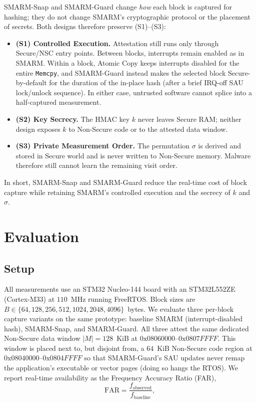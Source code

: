 \documentclass[conference]{IEEEtran}
\newcommand{\FAR}{FAR\xspace}
\newcommand{\smarmcopy}{SMARM-Snap\xspace}
\newcommand{\smarmlock}{SMARM-Guard\xspace}
\begin{document}
\smarmcopy and \smarmlock{} change \emph{how} each block is captured
for hashing; they do not change SMARM's cryptographic protocol or the
placement of secrets. Both designs therefore preserve (S1)--(S3):
\begin{itemize}
  \item \textbf{(S1) Controlled Execution.}
    Attestation still runs only through Secure/NSC entry points.
    Between blocks, interrupts remain enabled as in SMARM.
    Within a block, Atomic Copy keeps interrupts disabled for the
    entire \texttt{Memcpy}, and \smarmlock{} instead makes the
    selected block Secure-by-default for the duration of the in-place
    hash (after a brief IRQ-off SAU lock/unlock sequence).
    In either case, untrusted software cannot splice into a
    half-captured measurement.
  \item \textbf{(S2) Key Secrecy.}
    The HMAC key $k$ never leaves Secure RAM; neither design exposes
    $k$ to Non-Secure code or to the attested data window.
  \item \textbf{(S3) Private Measurement Order.}
    The permutation $\sigma$ is derived and stored in Secure world and
    is never written to Non-Secure memory. Malware therefore still
    cannot learn the remaining visit order.
\end{itemize}
In short, \smarmcopy and \smarmlock{} reduce the real-time cost of
block capture while retaining SMARM's controlled execution and the
secrecy of $k$ and $\sigma$.

\section{Evaluation}
\label{sec:eval}

\subsection{Setup}

All measurements use an STM32 Nucleo-144 board with an
STM32L552ZE (Cortex-M33) at $110$~MHz running FreeRTOS.
Block sizes are $B\in\{64,128,256,512,1024,2048,4096\}$~bytes.
We evaluate three per-block capture variants on the same prototype:
baseline SMARM (interrupt-disabled hash), \smarmcopy{}, and
\smarmlock{}.
All three attest the same dedicated Non-Secure data window
$|M|{=}128$~KiB at $0\mathrm{x}08060000$--$0\mathrm{x}0807FFFF$.
This window is placed next to, but disjoint from, a $64$~KiB
Non-Secure code region at $0\mathrm{x}08040000$--$0\mathrm{x}0804FFFF$
so that \smarmlock{}'s SAU updates never remap the application's
executable or vector pages (doing so hangs the RTOS).
We report real-time availability as the Frequency Accuracy Ratio
(\FAR),
\[
  \mathrm{FAR}=\frac{f_{\mathrm{observed}}}{f_{\mathrm{baseline}}},
\]
\end{document}
